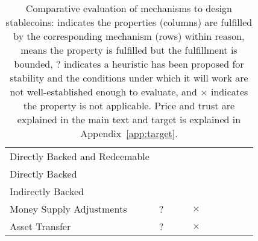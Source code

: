 \begin{table}[t!]
\begin{tabular}{llllllllll}
	Directly Backed and Redeemable	& \multicolumn{1}{|c|}{\full} 	& \multicolumn{1}{c|}{\full}   & \multicolumn{1}{c|}{} 		& \multicolumn{1}{c|}{} 		& \multicolumn{1}{c|}{\full} & \multicolumn{1}{c|}{\full}  & \multicolumn{1}{c|}{\full} & \multicolumn{1}{c|}{} & \multicolumn{1}{c|}{}   \\
	Directly Backed                              	& \multicolumn{1}{|c|}{} 		& \multicolumn{1}{c|}{\full}   & \multicolumn{1}{c|}{ } 	& \multicolumn{1}{c|}{} 		& \multicolumn{1}{c|}{\full} & \multicolumn{1}{c|}{\full} & \multicolumn{1}{c|}{\full} & \multicolumn{1}{c|}{} & \multicolumn{1}{c|}{}    \\
	Indirectly Backed 				& \multicolumn{1}{|c|}{\prt} 	& \multicolumn{1}{c|}{\full}   & \multicolumn{1}{c|}{\full} 	& \multicolumn{1}{c|}{\full} 	& \multicolumn{1}{c|}{\full} & \multicolumn{1}{c|}{}  & \multicolumn{1}{c|}{\full} & \multicolumn{1}{c|}{\full} & \multicolumn{1}{c|}{}   \\      
	Money Supply Adjustments             	& \multicolumn{1}{|c|}{?} 		& \multicolumn{1}{c|}{\prt}   & \multicolumn{1}{c|}{\full} 	& \multicolumn{1}{c|}{$\times$} 		& \multicolumn{1}{c|}{\full} & \multicolumn{1}{c|}{\prt}  & \multicolumn{1}{c|}{\full} & \multicolumn{1}{c|}{\full} & \multicolumn{1}{c|}{\full}   \\
	Asset Transfer	                                & \multicolumn{1}{|c|}{?} 		& \multicolumn{1}{c|}{\prt}   & \multicolumn{1}{c|}{\full} 	& \multicolumn{1}{c|}{$\times$} 		& \multicolumn{1}{c|}{\full} & \multicolumn{1}{c|}{\prt}  & \multicolumn{1}{c|}{\full} & \multicolumn{1}{c|}{\full} & \multicolumn{1}{c|}{\full}   \\
	\hline

	\end{tabular}
	\caption{Comparative evaluation of mechanisms to design stablecoins: {\full} indicates the properties (columns) are fulfilled by the corresponding mechanism (rows) within reason, {\prt} means the property is fulfilled but the fulfillment is bounded, {?} indicates a heuristic has been proposed for stability and the conditions under which it will work are not well-established enough to evaluate, and $\times$ indicates the property is not applicable. Price and trust are explained in the main text and target is explained in Appendix~\ref{app:target}.
	\label{tab:evframework}}
\end{table}